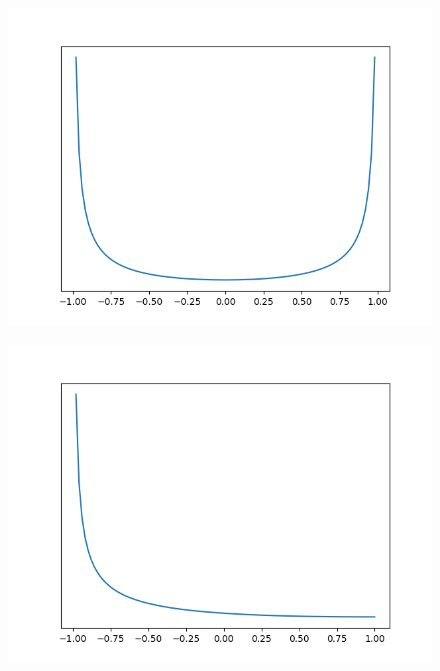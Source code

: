 \begin{figure}[!htbp]
    \centering
    \includegraphics[scale=0.5]
    {./content/figures/dists/beta_0.3_0.3}
    \caption{}
    \label{fig:beta-0.3-0.3}
\end{figure}

\begin{figure}[!htbp]
    \centering
    \includegraphics[scale=0.5]
    {./content/figures/dists/beta_0.3_3}
    \caption{}
    \label{fig:beta-0.3-3}
\end{figure}

